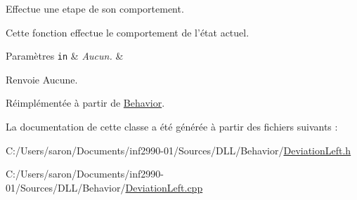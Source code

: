 Effectue une etape de son comportement. 

Cette fonction effectue le comportement de l'état actuel.


\begin{DoxyParams}[1]{Paramètres}
\mbox{\tt in}  & {\em Aucun.} & \\
\hline
\end{DoxyParams}
\begin{DoxyReturn}{Renvoie}
Aucune. 
\end{DoxyReturn}


Réimplémentée à partir de \hyperlink{group__inf2990_gac22f205bc85075ff707ad1f695c18439}{Behavior}.



La documentation de cette classe a été générée à partir des fichiers suivants \-:\begin{DoxyCompactItemize}
\item 
C\-:/\-Users/saron/\-Documents/inf2990-\/01/\-Sources/\-D\-L\-L/\-Behavior/\hyperlink{_deviation_left_8h}{Deviation\-Left.\-h}\item 
C\-:/\-Users/saron/\-Documents/inf2990-\/01/\-Sources/\-D\-L\-L/\-Behavior/\hyperlink{_deviation_left_8cpp}{Deviation\-Left.\-cpp}\end{DoxyCompactItemize}
